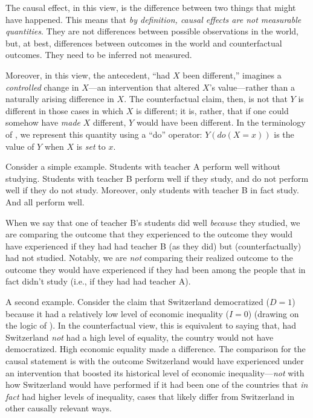 \documentclass[
  12pt,
]{book}
\begin{document}
The causal effect, in this view, is the difference between two things that might have happened. This means that \emph{by definition, causal effects are not measurable quantities}. They are not differences between possible observations in the world, but, at best, differences between outcomes in the world and counterfactual outcomes. They need to be inferred not measured.

Moreover, in this view, the antecedent, ``had \(X\) been different,'' imagines a \emph{controlled} change in \(X\)---an intervention that altered \(X\)'s value---rather than a naturally arising difference in \(X\). The counterfactual claim, then, is not that \(Y\) is different in those cases in which \(X\) is different; it is, rather, that if one could somehow have \emph{made} \(X\) different, \(Y\) would have been different. In the terminology of \citet{pearl2000causality}, we represent this quantity using a ``do'' operator: \(Y(do(X=x))\) is the value of \(Y\) when \(X\) is \emph{set} to \(x\).

Consider a simple example. Students with teacher A perform well without studying. Students with teacher B perform well if they study, and do not perform well if they do not study. Moreover, only students with teacher B in fact study. And all perform well.

When we say that one of teacher B's students did well \emph{because} they studied, we are comparing the outcome that they experienced to the outcome they would have experienced if they had had teacher B (as they did) but (counterfactually) had not studied. Notably, we are \emph{not} comparing their realized outcome to the outcome they would have experienced if they had been among the people that in fact didn't study (i.e., if they had had teacher A).

A second example. Consider the claim that Switzerland democratized (\(D=1\)) because it had a relatively low level of economic inequality (\(I=0\)) (drawing on the logic of \citet{boix2003democracy}). In the counterfactual view, this is equivalent to saying that, had Switzerland \emph{not} had a high level of equality, the country would not have democratized. High economic equality made a difference. The comparison for the causal statement is with the outcome Switzerland would have experienced under an intervention that boosted its historical level of economic inequality---\emph{not} with how Switzerland would have performed if it had been one of the countries that \emph{in fact} had higher levels of inequality, cases that likely differ from Switzerland in other causally relevant ways.
\end{document}
